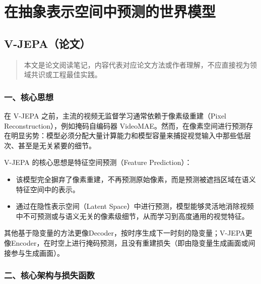\hypertarget{ux5728ux62bdux8c61ux8868ux793aux7a7aux95f4ux4e2dux9884ux6d4bux7684ux4e16ux754cux6a21ux578b}{%
\chapter{在抽象表示空间中预测的世界模型}\label{ux5728ux62bdux8c61ux8868ux793aux7a7aux95f4ux4e2dux9884ux6d4bux7684ux4e16ux754cux6a21ux578b}}

\hypertarget{v-jepaux8bbaux6587}{%
\section{V-JEPA（论文）}\label{v-jepaux8bbaux6587}}

\begin{quote}
本文是论文阅读笔记，内容代表对应论文方法或作者理解，不应直接视为领域共识或工程最佳实践。
\end{quote}

\hypertarget{ux4e00ux6838ux5fc3ux601dux60f3-26}{%
\subsection{一、核心思想}\label{ux4e00ux6838ux5fc3ux601dux60f3-26}}

在 V-JEPA 之前，主流的视频无监督学习通常依赖于像素级重建（Pixel Reconstruction），例如掩码自编码器 VideoMAE。然而，在像素空间进行预测存在明显劣势：模型必须分配大量计算能力和模型容量来捕捉视觉输入中那些低层次、甚至是无关紧要的细节。

V-JEPA 的核心思想是特征空间预测（Feature Prediction）：

\begin{itemize}
\tightlist
\item
  该模型完全摒弃了像素重建，不再预测原始像素，而是预测被遮挡区域在语义特征空间中的表示。
\item
  通过在隐性表示空间（Latent Space）中进行预测，模型能够灵活地消除视频中不可预测或与语义无关的像素级细节，从而学习到高度通用的视觉特征。
\end{itemize}

其他基于隐变量的方法更像Decoder，按时序生成下一时刻的隐变量；V-JEPA更像Encoder，在时空上进行掩码预测，且没有重建损失（即由隐变量生成画面或间接参与生成画面）。

\hypertarget{ux4e8cux6838ux5fc3ux67b6ux6784ux4e0eux635fux5931ux51fdux6570}{%
\subsection{二、核心架构与损失函数}\label{ux4e8cux6838ux5fc3ux67b6ux6784ux4e0eux635fux5931ux51fdux6570}}

